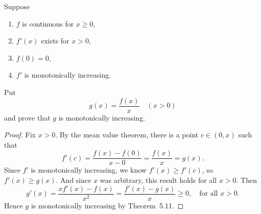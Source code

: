  Suppose
\begin{enumerate}
\item $f$ is continuous for $x\geq0$,
\item $f'(x)$ exists for $x > 0$,
\item $f(0) = 0$,
\item $f'$ is monotonically increasing.
\end{enumerate}
Put
\begin{equation*}
  g(x) = \frac{f(x)}x \quad(x > 0)
\end{equation*}
and prove that $g$ is monotonically increasing.
\begin{proof}
  Fix $x > 0$. By the mean value theorem, there is a point $c\in(0,x)$
  such that
  \begin{equation*}
    f'(c) = \frac{f(x) - f(0)}{x - 0} = \frac{f(x)}x = g(x).
  \end{equation*}
  Since $f'$ is monotonically increasing, we know $f'(x) \geq f'(c)$,
  so $f'(x) \geq g(x)$. And since $x$ was arbitrary, this result holds
  for all $x > 0$. Then
  \begin{equation*}
    g'(x) = \frac{xf'(x) - f(x)}{x^2}
    = \frac{f'(x) - g(x)}x
    \geq 0,
    \quad\text{for all $x > 0$}.
  \end{equation*}
  Hence $g$ is monotonically increasing by Theorem~5.11.
\end{proof}

